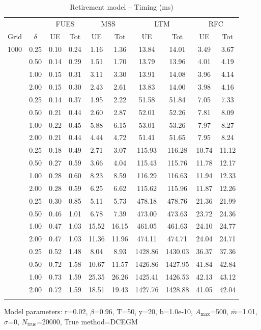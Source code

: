 \begin{table}[htbp]
\centering
\caption{Retirement model -- Timing (ms)}
\label{tab:timing}
\begin{tabular}{cc|cc|cc|cc|cc}
\toprule
 & & \multicolumn{2}{c|}{FUES} & \multicolumn{2}{c|}{MSS} & \multicolumn{2}{c|}{LTM} & \multicolumn{2}{c}{RFC} \\
Grid & $\delta$ & UE & Tot & UE & Tot & UE & Tot & UE & Tot \\
\midrule
1000 & 0.25 & 0.10 & 0.24 & 1.16 & 1.36 & 13.84 & 14.01 & 3.49 & 3.67 \\
 & 0.50 & 0.14 & 0.29 & 1.51 & 1.70 & 13.79 & 13.96 & 4.01 & 4.19 \\
 & 1.00 & 0.15 & 0.31 & 3.11 & 3.30 & 13.91 & 14.08 & 3.96 & 4.14 \\
 & 2.00 & 0.15 & 0.30 & 2.43 & 2.61 & 13.83 & 14.00 & 3.98 & 4.16 \\
\addlinespace[0.5em]
2000 & 0.25 & 0.14 & 0.37 & 1.95 & 2.22 & 51.58 & 51.84 & 7.05 & 7.33 \\
 & 0.50 & 0.21 & 0.44 & 2.60 & 2.87 & 52.01 & 52.26 & 7.81 & 8.09 \\
 & 1.00 & 0.22 & 0.45 & 5.88 & 6.15 & 53.01 & 53.26 & 7.97 & 8.27 \\
 & 2.00 & 0.21 & 0.44 & 4.44 & 4.72 & 51.41 & 51.65 & 7.95 & 8.24 \\
\addlinespace[0.5em]
3000 & 0.25 & 0.18 & 0.49 & 2.71 & 3.07 & 115.93 & 116.28 & 10.74 & 11.12 \\
 & 0.50 & 0.27 & 0.59 & 3.66 & 4.04 & 115.43 & 115.76 & 11.78 & 12.17 \\
 & 1.00 & 0.28 & 0.60 & 8.23 & 8.59 & 116.29 & 116.63 & 11.94 & 12.33 \\
 & 2.00 & 0.28 & 0.59 & 6.25 & 6.62 & 115.62 & 115.96 & 11.87 & 12.26 \\
\addlinespace[0.5em]
6000 & 0.25 & 0.30 & 0.85 & 5.11 & 5.73 & 478.18 & 478.76 & 21.36 & 21.99 \\
 & 0.50 & 0.46 & 1.01 & 6.78 & 7.39 & 473.00 & 473.63 & 23.72 & 24.36 \\
 & 1.00 & 0.47 & 1.03 & 15.52 & 16.15 & 461.05 & 461.63 & 24.10 & 24.77 \\
 & 2.00 & 0.47 & 1.03 & 11.36 & 11.96 & 474.11 & 474.71 & 24.04 & 24.71 \\
\addlinespace[0.5em]
10000 & 0.25 & 0.52 & 1.48 & 8.04 & 8.93 & 1428.86 & 1430.03 & 36.37 & 37.36 \\
 & 0.50 & 0.72 & 1.58 & 10.67 & 11.57 & 1426.86 & 1427.95 & 41.84 & 42.84 \\
 & 1.00 & 0.73 & 1.59 & 25.35 & 26.26 & 1425.41 & 1426.53 & 42.13 & 43.12 \\
 & 2.00 & 0.72 & 1.59 & 18.51 & 19.43 & 1427.76 & 1428.88 & 41.05 & 42.04 \\
\addlinespace[0.5em]
\bottomrule
\end{tabular}
\vspace{0.5em}
\footnotesize{Model parameters: r=0.02, $\beta$=0.96, T=50, y=20, b=1.0e-10, $A_{\max}$=500, $\bar{m}$=1.01, $\sigma$=0, $N_{\text{true}}$=20000, True method=DCEGM}
\end{table}